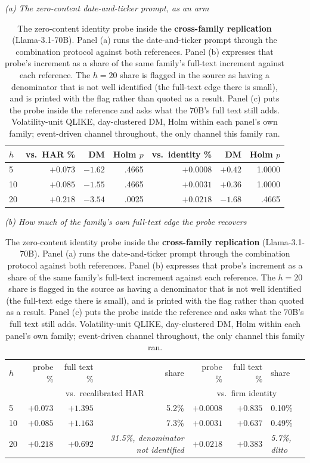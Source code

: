 \begin{table}[htbp]
\centering
\caption[The replication family's own zero-content probe]{The zero-content
identity probe inside the \textbf{cross-family replication}
(Llama-3.1-70B). Panel (a) runs the date-and-ticker prompt through the
combination protocol against both references. Panel (b) expresses that
probe's increment as a share of the same family's full-text increment
against each reference. The $h{=}20$ share is flagged in the source as
having a denominator that is not well identified (the full-text edge
there is small), and is printed with the flag rather than quoted as a
result. Panel (c) puts the probe inside the reference and asks what the
70B's full text still adds. Volatility-unit QLIKE, day-clustered DM, Holm
within each panel's own family; event-driven channel throughout, the only
channel this family ran.}
\label{tab:app-70b-probe}
\singlespacing\small
\setlength{\tabcolsep}{4pt}

\emph{(a) The zero-content date-and-ticker prompt, as an arm}\\[0.4ex]
\begin{tabular}{@{}lrrrrrr@{}}
\toprule
$h$ & vs.\ HAR \% & DM & Holm $p$ & vs.\ identity \% & DM & Holm $p$ \\
\midrule
 5 & $+0.073$ & $-1.62$ & .4665 & $+0.0008$ & $+0.42$ & 1.0000 \\
10 & $+0.085$ & $-1.55$ & .4665 & $+0.0031$ & $+0.36$ & 1.0000 \\
20 & $+0.218$ & $-3.54$ & .0025 & $+0.0218$ & $-1.68$ & .4665 \\
\bottomrule
\end{tabular}

\vspace{1.2ex}
\emph{(b) How much of the family's own full-text edge the probe recovers}\\[0.4ex]
\begin{tabular}{@{}lrrrrrl@{}}
\toprule
$h$ & probe \% & full text \% & share & probe \% & full text \% & share \\
 & \multicolumn{3}{c}{vs.\ recalibrated HAR} & \multicolumn{3}{c}{vs.\ firm identity} \\
\midrule
 5 & $+0.073$ & $+1.395$ & 5.2\% & $+0.0008$ & $+0.835$ & 0.10\% \\
10 & $+0.085$ & $+1.163$ & 7.3\% & $+0.0031$ & $+0.637$ & 0.49\% \\
20 & $+0.218$ & $+0.692$ & \emph{31.5\%, denominator not identified} & $+0.0218$ & $+0.383$ & \emph{5.7\%, ditto} \\
\bottomrule
\end{tabular}


\end{table}
